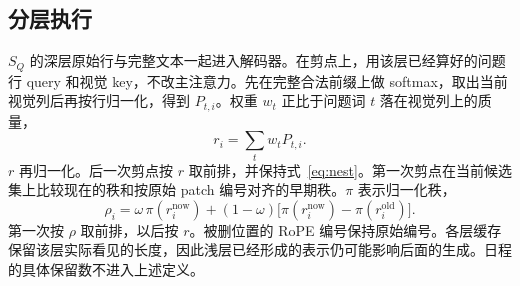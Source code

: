 \subsection{分层执行}
\label{sec:progressive}

$S_Q$ 的深层原始行与完整文本一起进入解码器。在剪点上，用该层已经算好的问题行 query 和视觉 key，不改主注意力。先在完整合法前缀上做 softmax，取出当前视觉列后再按行归一化，得到 $P_{t,i}$。权重 $w_t$ 正比于问题词 $t$ 落在视觉列上的质量，
\begin{equation}
r_i=\sum_t w_t P_{t,i}.
\label{eq:r}
\end{equation}
$r$ 再归一化。后一次剪点按 $r$ 取前排，并保持式~\eqref{eq:nest}。第一次剪点在当前候选集上比较现在的秩和按原始 patch 编号对齐的早期秩。$\pi$ 表示归一化秩，
\begin{equation}
\rho_i=\omega\,\pi(r_i^{\mathrm{now}})+(1-\omega)\bigl[\pi(r_i^{\mathrm{now}})-\pi(r_i^{\mathrm{old}})\bigr].
\label{eq:rho}
\end{equation}
第一次按 $\rho$ 取前排，以后按 $r$。被删位置的 RoPE 编号保持原始编号。各层缓存保留该层实际看见的长度，因此浅层已经形成的表示仍可能影响后面的生成。日程的具体保留数不进入上述定义。
